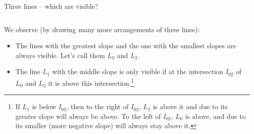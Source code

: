 \documentclass[ignorenonframetext,]{beamer}
\begin{document}
\begin{frame}[fragile]{Three lines -- which are visible?}

  \begin{columns}
    \begin{column}{0.5\textwidth}
      \caption{Three lines visible}
  \end{column}
  \pause
  \begin{column}{0.5\textwidth}
    
    \centering
    
\caption{Two lines visible}
\end{column}
\end{columns}
We observe (by drawing many more arrangements of three lines):
\scriptsize
\begin{itemize}[<-+>]
\item The lines with the greatest slope and the one with the smallest
  slopes are always visible. Let's call them $L_0$ and $L_2$.
\item The line $L_1$ with the middle slope is only visible if at the
  intersection $I_{02}$ of $L_0$ and $L_2$ it is above this
  intersection.\footnote{\tiny If $L_1$ is below $I_{02}$, then to the right of
    $I_{02}$, $L_2$ is above it and due to its greater slope will
    always be above. To the left of $I_{02}$, $L_0$ is above, and due
    to its smaller (more negative slope) will always stay above it.}
\end{itemize}

\end{frame}
\end{document}
